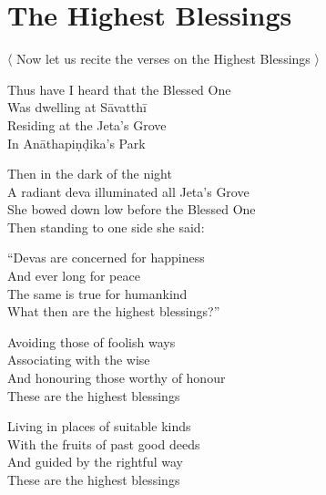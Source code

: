 \suttaRef{[MN 131]}


\section{The Highest Blessings}
\label{highest-blessings}

\begin{leader}
  〈 Now let us recite the verses on the Highest Blessings 〉
\end{leader}

Thus have I heard that the Blessed One\\
Was dwelling at Sāvatthī\\
Residing at the Jeta's Grove\\
In Anāthapiṇḍika's Park

\bigskip

Then in the dark of the night\\
A radiant deva illuminated all Jeta's Grove\\
She bowed down low before the Blessed One\\
Then standing to one side she said:

\bigskip

``Devas are concerned for happiness\\
And ever long for peace\\
The same is true for humankind\\
What then are the highest blessings?''

\bigskip

Avoiding those of foolish ways\\
Associating with the wise\\
And honouring those worthy of honour\\
These are the highest blessings

\bigskip

Living in places of suitable kinds\\
With the fruits of past good deeds\\
And guided by the rightful way\\
These are the highest blessings

